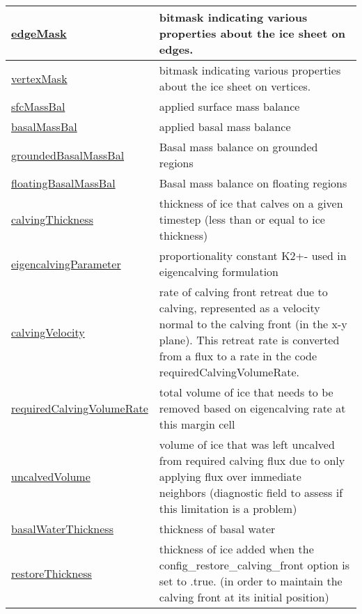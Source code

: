 {\begin{center}
\begin{longtable}{| p{2.0in} | p{4.0in} |}
    \hline
    \hyperref[subsec:var_sec_geometry_edgeMask]{edgeMask} & bitmask indicating various properties about the ice sheet on edges. \\
    \hline
    \hyperref[subsec:var_sec_geometry_vertexMask]{vertexMask} & bitmask indicating various properties about the ice sheet on vertices. \\
    \hline
    \hyperref[subsec:var_sec_geometry_sfcMassBal]{sfcMassBal} & applied surface mass balance \\
    \hline
    \hyperref[subsec:var_sec_geometry_basalMassBal]{basalMassBal} & applied basal mass balance \\
    \hline
    \hyperref[subsec:var_sec_geometry_groundedBasalMassBal]{groundedBasalMassBal} & Basal mass balance on grounded regions \\
    \hline
    \hyperref[subsec:var_sec_geometry_floatingBasalMassBal]{floatingBasalMassBal} & Basal mass balance on floating regions \\
    \hline
    \hyperref[subsec:var_sec_geometry_calvingThickness]{calvingThickness} & thickness of ice that calves on a given timestep (less than or equal to ice thickness) \\
    \hline
    \hyperref[subsec:var_sec_geometry_eigencalvingParameter]{eigencalvingParameter} & proportionality constant K2+- used in eigencalving formulation \\
    \hline
    \hyperref[subsec:var_sec_geometry_calvingVelocity]{calvingVelocity} & rate of calving front retreat due to calving, represented as a velocity normal to the calving front (in the x-y plane).  This retreat rate is converted from a flux to a rate in the code requiredCalvingVolumeRate. \\
    \hline
    \hyperref[subsec:var_sec_geometry_requiredCalvingVolumeRate]{requiredCalvingVolumeRate} & total volume of ice that needs to be removed based on eigencalving rate at this margin cell \\
    \hline
    \hyperref[subsec:var_sec_geometry_uncalvedVolume]{uncalvedVolume} & volume of ice that was left uncalved from required calving flux due to only applying flux over immediate neighbors (diagnostic field to assess if this limitation is a problem) \\
    \hline
    \hyperref[subsec:var_sec_geometry_basalWaterThickness]{basalWaterThickness} & thickness of basal water \\
    \hline
    \hyperref[subsec:var_sec_geometry_restoreThickness]{restoreThickness} & thickness of ice added when the config\_restore\_calving\_front option is set to .true. (in order to maintain the calving front at its initial position) \\

\end{longtable}
\end{center}}
